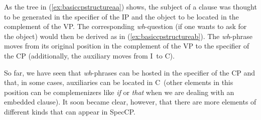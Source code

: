 
\noindent As the tree in (\ref{ex:basiccpstructureaa}) shows, the subject of a clause was thought to be generated in the specifier of the IP and the object to be located in the complement of the VP. The corresponding \textit{wh}-question (if one wants to ask for the object) would then be derived as in (\ref{ex:basiccpstructureab}). The \textit{wh}-phrase moves from its original position in the complement of the VP to the specifier of the CP (additionally, the auxiliary moves from I\textdegree\ to C\textdegree ). 

So far, we have seen that \textit{wh}-phrases can be hosted in the specifier of the CP and that, in some cases, auxiliaries can be located in C\textdegree\ (other elements in this position can be complemenizers like \textit{if} or \textit{that} when we are dealing with an embedded clause). It soon became clear, however, that there are more elements of different kinds that can appear in SpecCP. 

